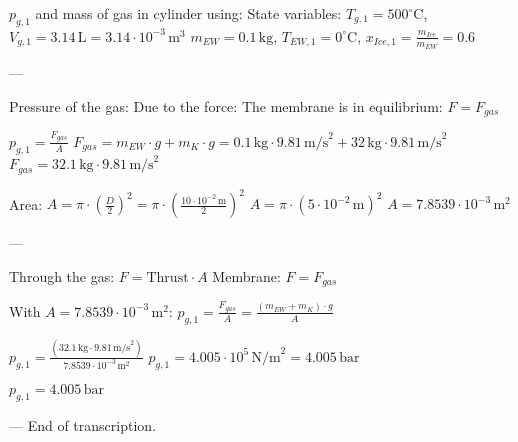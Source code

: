 \( p_{g,1} \) and mass of gas in cylinder using:  
State variables:  
\( T_{g,1} = 500^\circ \text{C} \), \( V_{g,1} = 3.14 \, \text{L} = 3.14 \cdot 10^{-3} \, \text{m}^3 \)  
\( m_{EW} = 0.1 \, \text{kg} \), \( T_{EW,1} = 0^\circ \text{C} \), \( x_{Ice,1} = \frac{m_{Ice}}{m_{EW}} = 0.6 \)  

---

Pressure of the gas:  
Due to the force:  
The membrane is in equilibrium: \( F = F_{gas} \)  

\( p_{g,1} = \frac{F_{gas}}{A} \)  
\( F_{gas} = m_{EW} \cdot g + m_{K} \cdot g = 0.1 \, \text{kg} \cdot 9.81 \, \text{m/s}^2 + 32 \, \text{kg} \cdot 9.81 \, \text{m/s}^2 \)  
\( F_{gas} = 32.1 \, \text{kg} \cdot 9.81 \, \text{m/s}^2 \)  

Area:  
\( A = \pi \cdot \left(\frac{D}{2}\right)^2 = \pi \cdot \left(\frac{10 \cdot 10^{-2} \, \text{m}}{2}\right)^2 \)  
\( A = \pi \cdot (5 \cdot 10^{-2} \, \text{m})^2 \)  
\( A = 7.8539 \cdot 10^{-3} \, \text{m}^2 \)  

---

Through the gas:  
\( F = \text{Thrust} \cdot A \)  
Membrane:  
\( F = F_{gas} \)  

With \( A = 7.8539 \cdot 10^{-3} \, \text{m}^2 \):  
\( p_{g,1} = \frac{F_{gas}}{A} = \frac{(m_{EW} + m_{K}) \cdot g}{A} \)  

\( p_{g,1} = \frac{(32.1 \, \text{kg} \cdot 9.81 \, \text{m/s}^2)}{7.8539 \cdot 10^{-3} \, \text{m}^2} \)  
\( p_{g,1} = 4.005 \cdot 10^5 \, \text{N/m}^2 = 4.005 \, \text{bar} \)  

\( p_{g,1} = 4.005 \, \text{bar} \)  

---  
End of transcription.